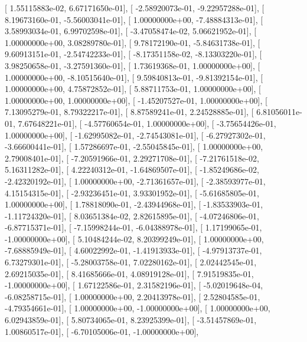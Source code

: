 \documentclass{article}
\begin{document}
       [  1.55115883e-02,   6.67171650e-01],
       [ -2.58920073e-01,  -9.22957288e-01],
       [  8.19673160e-01,  -5.56003041e-01],
       [  1.00000000e+00,  -7.48884313e-01],
       [  3.58993034e-01,   6.99702598e-01],
       [ -3.47058474e-02,   5.06621952e-01],
       [  1.00000000e+00,   3.08289780e-01],
       [  9.78172190e-01,  -5.84631738e-01],
       [  9.60913151e-01,  -2.54742233e-01],
       [ -8.17351158e-02,  -8.13303220e-01],
       [  3.98250658e-01,  -3.27591360e-01],
       [  1.73619368e-01,   1.00000000e+00],
       [  1.00000000e+00,  -8.10515640e-01],
       [  9.59840813e-01,  -9.81392154e-01],
       [  1.00000000e+00,   4.75872852e-01],
       [  5.88711753e-01,   1.00000000e+00],
       [  1.00000000e+00,   1.00000000e+00],
       [ -1.45207527e-01,   1.00000000e+00],
       [  7.13095279e-01,   8.79322217e-01],
       [  8.87589241e-01,   2.24528885e-01],
       [  6.81056011e-01,   7.67648221e-01],
       [ -4.57760654e-01,   1.00000000e+00],
       [ -3.75654426e-01,   1.00000000e+00],
       [ -1.62995082e-01,  -2.74543081e-01],
       [ -6.27927302e-01,  -3.66600441e-01],
       [  1.57286697e-01,  -2.55045845e-01],
       [  1.00000000e+00,   2.79008401e-01],
       [ -7.20591966e-01,   2.29271708e-01],
       [ -7.21761518e-02,   5.16311282e-01],
       [  4.22240312e-01,  -1.64869507e-01],
       [ -1.85249686e-02,  -2.42320192e-01],
       [  1.00000000e+00,  -2.71361657e-01],
       [ -2.38593977e-01,   4.15154315e-01],
       [ -2.93236451e-01,   3.93301952e-01],
       [ -5.61685805e-01,   1.00000000e+00],
       [  1.78818090e-01,  -2.43944968e-01],
       [ -1.83533903e-01,  -1.11724320e-01],
       [  8.03651384e-02,   2.82615895e-01],
       [ -4.07246806e-01,  -6.87715371e-01],
       [ -7.15998244e-01,  -6.04388978e-01],
       [  1.17199065e-01,  -1.00000000e+00],
       [  5.10484244e-02,   8.20399249e-01],
       [  1.00000000e+00,  -7.68885949e-01],
       [  4.60022992e-01,  -1.41913933e-01],
       [ -4.97913737e-01,   6.73279301e-01],
       [ -5.28003758e-01,   7.02280162e-01],
       [  2.02442545e-01,   2.69215035e-01],
       [  8.41685666e-01,   4.08919128e-01],
       [  7.91519835e-01,  -1.00000000e+00],
       [  1.67122586e-01,   2.31582196e-01],
       [ -5.02019648e-04,  -6.08258715e-01],
       [  1.00000000e+00,   2.20413978e-01],
       [  2.52804585e-01,  -4.79354661e-01],
       [  1.00000000e+00,  -1.00000000e+00],
       [  1.00000000e+00,   6.02943859e-01],
       [  5.80734065e-01,   8.23925399e-01],
       [ -3.51457869e-01,   1.00860517e-01],
       [ -6.70105006e-01,  -1.00000000e+00],
\end{document}
